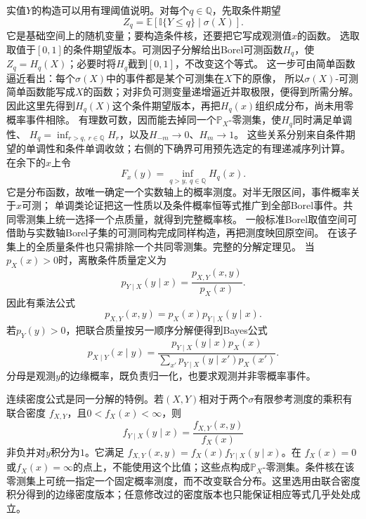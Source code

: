 实值\(Y\)的构造可以用有理阈值说明。对每个\(q\in\mathbb Q\)，先取条件期望
\[
 Z_q=\mathbb E[\mathbb I\{Y\leq q\}\mid\sigma(X)].
\]
它是基础空间上的随机变量；要构造条件核，还要把它写成观测值\(x\)的函数。
选取取值于\([0,1]\)的条件期望版本。可测因子分解给出Borel可测函数\(H_q\)，使\(Z_q=H_q(X)\)；必要时将\(H_q\)截到\([0,1]\)，不改变这个等式。
这一步可由简单函数逼近看出：每个\(\sigma(X)\)中的事件都是某个可测集在\(X\)下的原像，
所以\(\sigma(X)\)-可测简单函数能写成\(X\)的函数；对非负可测变量递增逼近并取极限，便得到所需分解。
因此这里先得到\(H_q(X)\)这个条件期望版本，再把\(H_q(x)\)组织成分布，尚未用零概率事件相除。
有理数可数，因而能去掉同一个\(\mathbb P_X\)-零测集，使\(H_q\)同时满足单调性、
\(H_q=\inf_{r>q,\ r\in\mathbb Q}H_r\)，以及\(H_{-m}\to0\)、\(H_m\to1\)。
这些关系分别来自条件期望的单调性和条件单调收敛；右侧的下确界可用预先选定的有理递减序列计算。
在余下的\(x\)上令
\[ F_x(y)=\inf_{q>y,\ q\in\mathbb Q}H_q(x). \]
它是分布函数，故唯一确定一个实数轴上的概率测度。对半无限区间，事件概率关于\(x\)可测；
单调类论证把这一性质以及条件概率恒等式推广到全部Borel事件。共同零测集上统一选择一个点质量，就得到完整概率核。
一般标准Borel取值空间可借助与实数轴Borel子集的可测同构完成同样构造，再把测度映回原空间。
在该子集上的全质量条件也只需排除一个共同零测集。完整的分解定理见。
当\(p_X(x)>0\)时，离散条件质量定义为
\[ p_{Y\mid X}(y\mid x)
  =\frac{p_{X,Y}(x,y)}{p_X(x)}. \]
因此有乘法公式
\[ p_{X,Y}(x,y)=p_X(x)p_{Y\mid X}(y\mid x). \]
若\(p_Y(y)>0\)，把联合质量按另一顺序分解便得到Bayes公式
\begin{equation}
  p_{X\mid Y}(x\mid y)
  =
  \frac{p_{Y\mid X}(y\mid x)p_X(x)}
       {\sum_{x'}p_{Y\mid X}(y\mid x')p_X(x')}.
  \label{eq:probability-discrete-bayes}
\end{equation}
分母是观测\(y\)的边缘概率，既负责归一化，也要求观测并非零概率事件。

连续密度公式是同一分解的特例。若\((X,Y)\)相对于两个\(\sigma\)有限参考测度的乘积有联合密度
\(f_{X,Y}\)，且\(0<f_X(x)<\infty\)，则
\[
  f_{Y\mid X}(y\mid x)
  =\frac{f_{X,Y}(x,y)}{f_X(x)}
\]
非负并对\(y\)积分为\(1\)。它满足
\(f_{X,Y}(x,y)=f_X(x)f_{Y\mid X}(y\mid x)\)。在
\(f_X(x)=0\)或\(f_X(x)=\infty\)的点上，不能使用这个比值；这些点构成\(\mathbb P_X\)-零测集。条件核在该零测集上可统一指定一个固定概率测度，而不改变联合分布。这里选用由联合密度积分得到的边缘密度版本；任意修改过的密度版本也只能保证相应等式几乎处处成立。

